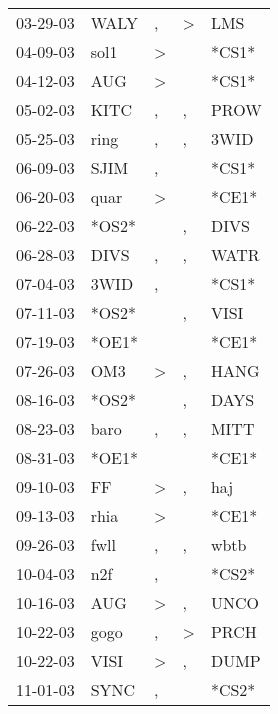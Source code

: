 \begin{supertabular}{lllll}
 03-29-03 &   WALY &                , &     \textgreater &    LMS \\
 04-09-03 &   sol1 &     \textgreater &                  &  *CS1* \\
 04-12-03 &    AUG &     \textgreater &                  &  *CS1* \\
 05-02-03 &   KITC &                , &                , &   PROW \\
 05-25-03 &   ring &                , &                , &   3WID \\
 06-09-03 &   SJIM &                , &                  &  *CS1* \\
 06-20-03 &   quar &     \textgreater &                  &  *CE1* \\
 06-22-03 &  *OS2* &                  &                , &   DIVS \\
 06-28-03 &   DIVS &                , &                , &   WATR \\
 07-04-03 &   3WID &                , &                  &  *CS1* \\
 07-11-03 &  *OS2* &                  &                , &   VISI \\
 07-19-03 &  *OE1* &                  &                  &  *CE1* \\
 07-26-03 &    OM3 &     \textgreater &                , &   HANG \\
 08-16-03 &  *OS2* &                  &                , &   DAYS \\
 08-23-03 &   baro &                , &                , &   MITT \\
 08-31-03 &  *OE1* &                  &                  &  *CE1* \\
 09-10-03 &     FF &     \textgreater &                , &    haj \\
 09-13-03 &   rhia &     \textgreater &                  &  *CE1* \\
 09-26-03 &   fwll &                , &                , &   wbtb \\
 10-04-03 &    n2f &                , &                  &  *CS2* \\
 10-16-03 &    AUG &     \textgreater &                , &   UNCO \\
 10-22-03 &   gogo &                , &     \textgreater &   PRCH \\
 10-22-03 &   VISI &     \textgreater &                , &   DUMP \\
 11-01-03 &   SYNC &                , &                  &  *CS2* \\

\end{supertabular}
